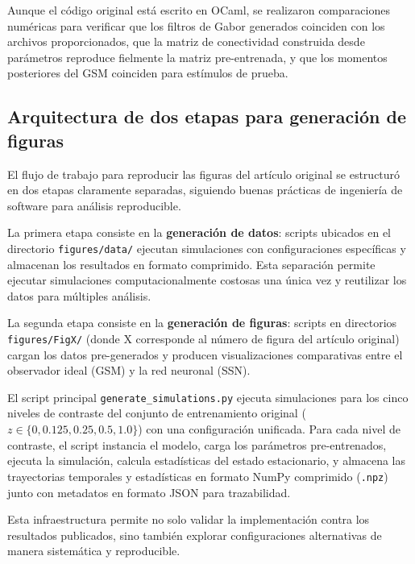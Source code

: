 Aunque el código original está escrito en OCaml, se realizaron comparaciones numéricas para verificar que los filtros de Gabor generados coinciden con los archivos proporcionados, que la matriz de conectividad construida desde parámetros reproduce fielmente la matriz pre-entrenada, y que los momentos posteriores del GSM coinciden para estímulos de prueba.

\subsection{Arquitectura de dos etapas para generación de figuras}
\label{subsec:impl_dos_etapas}

El flujo de trabajo para reproducir las figuras del artículo original se estructuró en dos etapas claramente separadas, siguiendo buenas prácticas de ingeniería de software para análisis reproducible.

La primera etapa consiste en la \textbf{generación de datos}: scripts ubicados en el directorio \texttt{figures/data/} ejecutan simulaciones con configuraciones específicas y almacenan los resultados en formato comprimido. Esta separación permite ejecutar simulaciones computacionalmente costosas una única vez y reutilizar los datos para múltiples análisis.

La segunda etapa consiste en la \textbf{generación de figuras}: scripts en directorios \texttt{figures/FigX/} (donde X corresponde al número de figura del artículo original) cargan los datos pre-generados y producen visualizaciones comparativas entre el observador ideal (\acrshort{GSM}) y la red neuronal (\acrshort{SSN}).

El script principal \texttt{generate\_simulations.py} ejecuta simulaciones para los cinco niveles de contraste del conjunto de entrenamiento original ($z \in \{0,\allowbreak 0.125,\allowbreak 0.25,\allowbreak 0.5,\allowbreak 1.0\}$) con una configuración unificada. Para cada nivel de contraste, el script instancia el modelo, carga los parámetros pre-entrenados, ejecuta la simulación, calcula estadísticas del estado estacionario, y almacena las trayectorias temporales y estadísticas en formato NumPy comprimido (\texttt{.npz}) junto con metadatos en formato JSON para trazabilidad.

Esta infraestructura permite no solo validar la implementación contra los resultados publicados, sino también explorar configuraciones alternativas de manera sistemática y reproducible.


